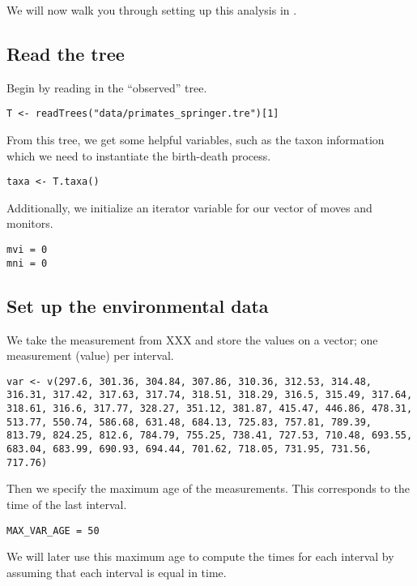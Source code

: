 We will now walk you through setting up this analysis in \RevBayes.

\subsection{Read the tree}

Begin by reading in the ``observed'' tree. 
{\tt \begin{snugshade*}
\begin{lstlisting}
T <- readTrees("data/primates_springer.tre")[1]
\end{lstlisting}
\end{snugshade*}}

From this tree, we get some helpful variables, such as the taxon information which we need to instantiate the birth-death process.
{\tt \begin{snugshade*}
\begin{lstlisting}
taxa <- T.taxa()
\end{lstlisting}
\end{snugshade*}}

Additionally, we initialize an iterator variable for our vector of moves and monitors.
{\tt \begin{snugshade*}
\begin{lstlisting}
mvi = 0
mni = 0
\end{lstlisting}
\end{snugshade*}}



\subsection{Set up the environmental data}

We take the \COO measurement from {\color{red}XXX} and store the values on a vector; one measurement (value) per interval.
{\tt \begin{snugshade*}
\begin{lstlisting}
var <- v(297.6, 301.36, 304.84, 307.86, 310.36, 312.53, 314.48, 316.31, 317.42, 317.63, 317.74, 318.51, 318.29, 316.5, 315.49, 317.64, 318.61, 316.6, 317.77, 328.27, 351.12, 381.87, 415.47, 446.86, 478.31, 513.77, 550.74, 586.68, 631.48, 684.13, 725.83, 757.81, 789.39, 813.79, 824.25, 812.6, 784.79, 755.25, 738.41, 727.53, 710.48, 693.55, 683.04, 683.99, 690.93, 694.44, 701.62, 718.05, 731.95, 731.56, 717.76)
\end{lstlisting}
\end{snugshade*}}
Then we specify the maximum age of the measurements.
This corresponds to the time of the last interval.
{\tt \begin{snugshade*}
\begin{lstlisting}
MAX_VAR_AGE = 50
\end{lstlisting}
\end{snugshade*}}
We will later use this maximum age to compute the times for each interval by assuming that each interval is equal in time.


